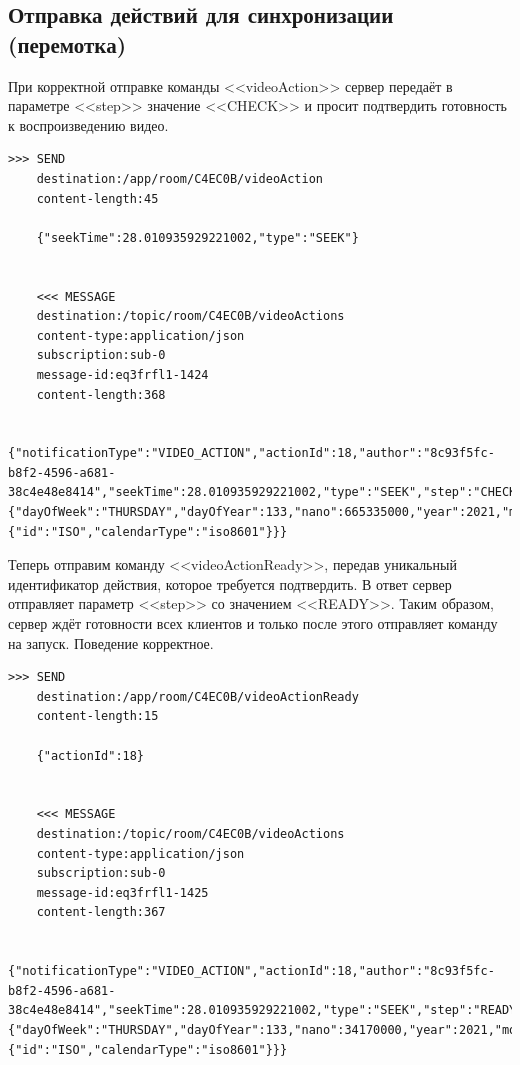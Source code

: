 \documentclass{../../includes/TechDoc}
\begin{document}
    \subsection{Отправка действий для синхронизации (перемотка)}

    При корректной отправке команды <<videoAction>> сервер передаёт в параметре <<step>> значение <<CHECK>> и просит подтвердить готовность к воспроизведению видео.

    \begin{lstlisting}[language=text,caption={Запрос и ответ при отправке действия для синхронизации}]
    >>> SEND
    destination:/app/room/C4EC0B/videoAction
    content-length:45

    {"seekTime":28.010935929221002,"type":"SEEK"}


    <<< MESSAGE
    destination:/topic/room/C4EC0B/videoActions
    content-type:application/json
    subscription:sub-0
    message-id:eq3frfl1-1424
    content-length:368

    {"notificationType":"VIDEO_ACTION","actionId":18,"author":"8c93f5fc-b8f2-4596-a681-38c4e48e8414","seekTime":28.010935929221002,"type":"SEEK","step":"CHECK","actionTime":{"dayOfWeek":"THURSDAY","dayOfYear":133,"nano":665335000,"year":2021,"monthValue":5,"dayOfMonth":13,"hour":23,"minute":45,"second":4,"month":"MAY","chronology":{"id":"ISO","calendarType":"iso8601"}}}
    \end{lstlisting}

    Теперь отправим команду <<videoActionReady>>, передав уникальный идентификатор действия, которое требуется подтвердить.
    В ответ сервер отправляет параметр <<step>> со значением <<READY>>.
    Таким образом, сервер ждёт готовности всех клиентов и только после этого отправляет команду на запуск.
    Поведение корректное.

    \begin{lstlisting}[language=text,caption={Подтверждение готовности воспроизвести видео}]
    >>> SEND
    destination:/app/room/C4EC0B/videoActionReady
    content-length:15

    {"actionId":18}


    <<< MESSAGE
    destination:/topic/room/C4EC0B/videoActions
    content-type:application/json
    subscription:sub-0
    message-id:eq3frfl1-1425
    content-length:367

    {"notificationType":"VIDEO_ACTION","actionId":18,"author":"8c93f5fc-b8f2-4596-a681-38c4e48e8414","seekTime":28.010935929221002,"type":"SEEK","step":"READY","actionTime":{"dayOfWeek":"THURSDAY","dayOfYear":133,"nano":34170000,"year":2021,"monthValue":5,"dayOfMonth":13,"hour":23,"minute":45,"second":5,"month":"MAY","chronology":{"id":"ISO","calendarType":"iso8601"}}}
    \end{lstlisting}

    \registrationList
\end{document}
